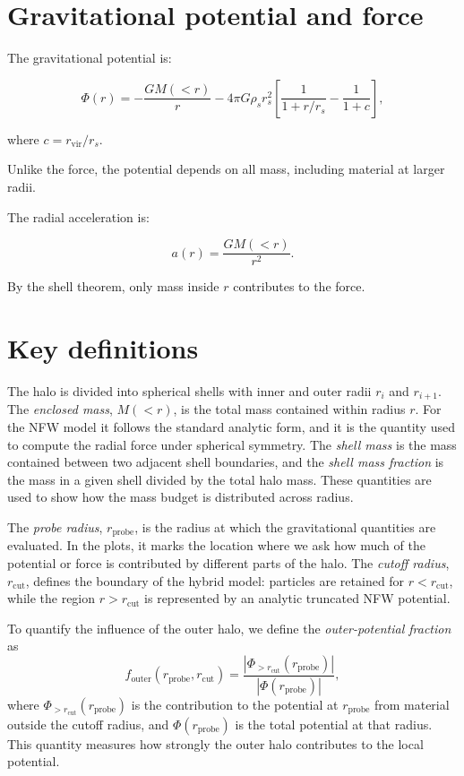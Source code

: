 \documentclass[11pt,a4paper]{article}
\begin{document}
\section{Gravitational potential and force}
The gravitational potential is:

\begin{equation}
\Phi(r) = -\frac{G M(<r)}{r}
- 4\pi G \rho_s r_s^2 \left[ \frac{1}{1 + r/r_s} - \frac{1}{1 + c} \right],
\end{equation}

where $c = r_{\mathrm{vir}} / r_s$.

Unlike the force, the potential depends on all mass, including material at larger radii.

The radial acceleration is:

\begin{equation}
a(r) = \frac{G M(<r)}{r^2}.
\end{equation}

By the shell theorem, only mass inside $r$ contributes to the force.

\section{Key definitions}

The halo is divided into spherical shells with inner and outer radii $r_i$ and $r_{i+1}$. The \emph{enclosed mass}, $M(<r)$, is the total mass contained within radius $r$. For the NFW model it follows the standard analytic form, and it is the quantity used to compute the radial force under spherical symmetry. The \emph{shell mass} is the mass contained between two adjacent shell boundaries, and the \emph{shell mass fraction} is the mass in a given shell divided by the total halo mass. These quantities are used to show how the mass budget is distributed across radius.

The \emph{probe radius}, $r_{\mathrm{probe}}$, is the radius at which the gravitational quantities are evaluated. In the plots, it marks the location where we ask how much of the potential or force is contributed by different parts of the halo. The \emph{cutoff radius}, $r_{\mathrm{cut}}$, defines the boundary of the hybrid model: particles are retained for $r < r_{\mathrm{cut}}$, while the region $r > r_{\mathrm{cut}}$ is represented by an analytic truncated NFW potential.

To quantify the influence of the outer halo, we define the \emph{outer-potential fraction} as
\begin{equation}
f_{\mathrm{outer}}(r_{\mathrm{probe}}, r_{\mathrm{cut}}) =
\frac{\left|\Phi_{>r_{\mathrm{cut}}}(r_{\mathrm{probe}})\right|}
{\left|\Phi(r_{\mathrm{probe}})\right|},
\end{equation}
where $\Phi_{>r_{\mathrm{cut}}}(r_{\mathrm{probe}})$ is the contribution to the potential at $r_{\mathrm{probe}}$ from material outside the cutoff radius, and $\Phi(r_{\mathrm{probe}})$ is the total potential at that radius. This quantity measures how strongly the outer halo contributes to the local potential.
\end{document}
